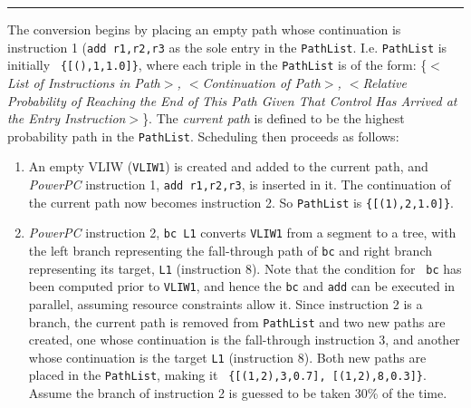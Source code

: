 
\setlength{\oddsidemargin}{-0.19in}
\setlength{\textwidth}{6.8in}
\setlength{\textheight}{9.8in}
\setlength{\columnsep}{2.0pc}
\setlength{\topmargin}{-0.30in}
\setlength{\headheight}{-0.30in}
\setlength{\headsep}{0.0in}
\setlength{\parindent}{1pc}

\renewcommand{\baselinestretch}{0.90}

\pagestyle{empty}



\noindent\rule{6.79in}{1.00mm}

\begin{small} 
The conversion begins by placing an empty path whose
continuation is instruction 1 ({\tt add r1,r2,r3} as the sole entry
in the {\tt PathList}.  I.e. {\tt PathList} is initially {\tt
\{[(),1,1.0]\}}, where each triple in the {\tt PathList} is of the
form:  \{{\it $<$List of Instructions in Path$>$, $<$Continuation of
Path$>$, $<$Relative Probability of Reaching the End of This Path
Given That Control Has Arrived at the Entry Instruction$>$}\}.  The
{\it current path} is defined to be the highest probability path in
the {\tt PathList}.  Scheduling then proceeds as follows:

\begin{enumerate}

\item An empty VLIW ({\tt VLIW1}) is created and added to the
current path, and {\it PowerPC} instruction 1, {\tt add r1,r2,r3}, is
inserted in it.  The continuation of the current path now becomes
instruction 2. So {\tt PathList} is {\tt \{[(1),2,1.0]\}}.

\item {\it PowerPC} instruction 2, {\tt bc L1} converts {\tt VLIW1}
from a segment to a tree, with the left branch representing the
fall-through path of {\tt bc} and right branch representing its
target, {\tt L1} (instruction 8).  Note that the condition for {\tt
bc} has been computed prior to {\tt VLIW1}, and hence the {\tt bc}
and {\tt add} can be executed in parallel, assuming resource
constraints allow it.  Since instruction 2 is a branch, the current
path is removed from {\tt PathList} and two new paths are created,
one whose continuation is the fall-through instruction 3, and
another whose continuation is the target {\tt L1} (instruction 8).
Both new paths are placed in the {\tt PathList}, making it {\tt
\{[(1,2),3,0.7], [(1,2),8,0.3]\}}.  Assume the branch of instruction
2 is guessed to be taken 30\% of the time.


\end{enumerate}
\end{small}
